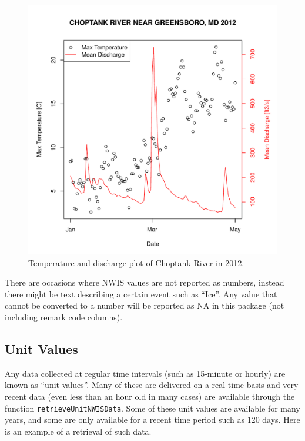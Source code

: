 \documentclass[a4paper,11pt]{article}\usepackage[]{graphicx}\usepackage[]{color}
\newenvironment{knitrout}{}{} %
\begin{document}
\begin{knitrout}
\begin{figure}[]
\includegraphics[width=1\linewidth,height=1\linewidth]{figure/getNWIStemperaturePlot} \caption[Temperature and discharge plot of Choptank River in 2012]{Temperature and discharge plot of Choptank River in 2012.\label{fig:getNWIStemperaturePlot}}
\end{figure}


\end{knitrout}


There are occasions where NWIS values are not reported as numbers, instead there might be text describing a certain event such as \enquote{Ice}.  Any value that cannot be converted to a number will be reported as NA in this package (not including remark code columns).

\FloatBarrier

\subsection{Unit Values}
\label{sec:usgsRT}
Any data collected at regular time intervals (such as 15-minute or hourly) are known as \enquote{unit values}. Many of these are delivered on a real time basis and very recent data (even less than an hour old in many cases) are available through the function \texttt{retrieveUnitNWISData}.  Some of these unit values are available for many years, and some are only available for a recent time period such as 120 days.  Here is an example of a retrieval of such data.  
\end{document}
